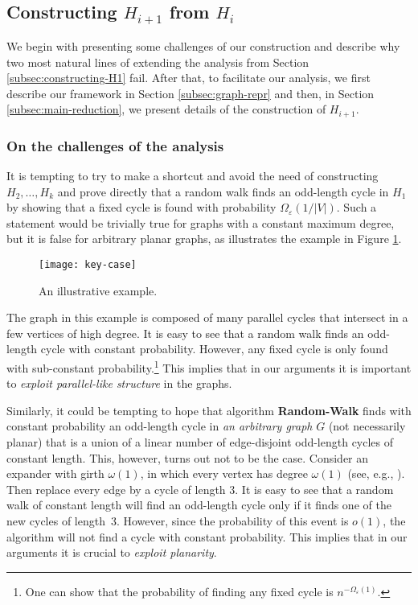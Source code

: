 \documentclass[11pt]{article}
\newcommand{\eps}{\ensuremath{\epsilon}}
\def\epsilon{\ensuremath{\varepsilon}}
\newcommand{\RW}{{\bf Random-Walk}}
\begin{document}
\subsection{Constructing $H_{i+1}$ from $H_i$}

We begin with presenting some challenges of our construction and describe why two most natural lines of extending the analysis from Section \ref{subsec:constructing-H1} fail. After that, to facilitate our analysis, we first describe our framework in Section \ref{subsec:graph-repr} and then, in Section \ref{subsec:main-reduction}, we present details of the construction of $H_{i+1}$.



\subsubsection{On the challenges of the analysis}
\label{subsec:failures}

It is tempting to try to make a shortcut and avoid the need of constructing $H_2, \dots, H_k$ and prove directly that a random walk finds an odd-length cycle in $H_1$ by showing that a fixed cycle is found with probability $\Omega_{\eps}(1/|V|)$. Such a statement would be trivially true for graphs with a constant maximum degree, but it is false for arbitrary planar graphs, as  illustrates the example in Figure \ref{figure:key}.
\begin{figure}[t]
\centerline{\texttt{[image: key-case]}}
\caption{An illustrative example.}
\label{figure:key}
\end{figure}
The graph in this example is composed of many parallel cycles that intersect in a few vertices of high degree. It is easy to see that a random walk finds an odd-length cycle with constant probability. However, any fixed cycle is only found with sub-constant probability.\footnote{One can show that the probability of finding any fixed cycle is $n^{-\Omega_\eps(1)}$.} This implies that in our arguments it is important to \emph{exploit parallel-like structure} in the graphs.

Similarly, it could be tempting to hope that algorithm \RW{} finds with constant probability an odd-length cycle in \emph{an arbitrary graph} $G$ (not necessarily planar) that is a union of a linear number of edge-disjoint odd-length cycles of constant length.
This, however, turns out not to be the case. Consider
an expander with girth $\omega(1)$, in which every vertex has degree $\omega(1)$ (see, e.g., \cite{LPS88}). Then replace every edge by a cycle of length 3. It is easy to see that a random walk of constant length will find an odd-length cycle only if it finds one of the new cycles of length~3. However, since the probability of this event is $o(1)$, the algorithm will not find a cycle with constant probability. This implies that in our arguments it is crucial to \emph{exploit planarity}.
\end{document}
